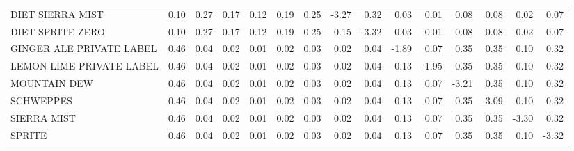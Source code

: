 \begin{tabular}{lrrrrrrrrrrrrrr}
DIET SIERRA MIST              &        0.10 &             0.27 &                           0.17 &                           0.12 &               0.19 &            0.25 &             -3.27 &              0.32 &                      0.03 &                      0.01 &          0.08 &       0.08 &         0.02 &    0.07 \\
DIET SPRITE ZERO              &        0.10 &             0.27 &                           0.17 &                           0.12 &               0.19 &            0.25 &              0.15 &             -3.32 &                      0.03 &                      0.01 &          0.08 &       0.08 &         0.02 &    0.07 \\
GINGER ALE PRIVATE LABEL      &        0.46 &             0.04 &                           0.02 &                           0.01 &               0.02 &            0.03 &              0.02 &              0.04 &                     -1.89 &                      0.07 &          0.35 &       0.35 &         0.10 &    0.32 \\
LEMON LIME PRIVATE LABEL      &        0.46 &             0.04 &                           0.02 &                           0.01 &               0.02 &            0.03 &              0.02 &              0.04 &                      0.13 &                     -1.95 &          0.35 &       0.35 &         0.10 &    0.32 \\
MOUNTAIN DEW                  &        0.46 &             0.04 &                           0.02 &                           0.01 &               0.02 &            0.03 &              0.02 &              0.04 &                      0.13 &                      0.07 &         -3.21 &       0.35 &         0.10 &    0.32 \\
SCHWEPPES                     &        0.46 &             0.04 &                           0.02 &                           0.01 &               0.02 &            0.03 &              0.02 &              0.04 &                      0.13 &                      0.07 &          0.35 &      -3.09 &         0.10 &    0.32 \\
SIERRA MIST                   &        0.46 &             0.04 &                           0.02 &                           0.01 &               0.02 &            0.03 &              0.02 &              0.04 &                      0.13 &                      0.07 &          0.35 &       0.35 &        -3.30 &    0.32 \\
SPRITE                        &        0.46 &             0.04 &                           0.02 &                           0.01 &               0.02 &            0.03 &              0.02 &              0.04 &                      0.13 &                      0.07 &          0.35 &       0.35 &         0.10 &   -3.32 \\
\bottomrule
\end{tabular}
